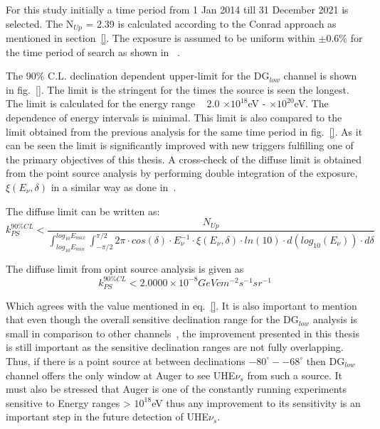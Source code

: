 For this study initially a time period from 1 Jan 2014 till 31 December 2021 is selected. The N$_{Up}$ = 2.39 is calculated according to the Conrad approach as mentioned in section~\ref{}. The exposure is assumed to be uniform within $\pm 0.6\%$ for the time period of search as shown in ~\cite{}. 

The 90\% C.L. declination dependent upper-limit for the DG$_{low}$ channel is shown in fig.~\ref{}. The limit is the stringent for the times the source is seen the longest. The limit is calculated for the energy range ~ 2.0 $\times 10^{18}$eV - $\times 10^{20}$eV. The dependence of energy intervals is minimal. This limit is also compared to the limit obtained from the previous analysis for the same time period in fig.~\ref{}. As it can be seen the limit is significantly improved with new triggers fulfilling one of the primary objectives of this thesis.     
A cross-check of the diffuse limit is obtained from the point source analysis by performing double integration of the exposure, $\xi(E_{\nu}, \delta)$ in a similar way as done in~\cite{}.

The diffuse limit can be written as:
\begin{equation}
  k_{PS}^{90\%CL} < \frac{N_{Up}}{\int_{log_{10}E_{min}}^{log_{10}E_{max}} \int_{-\pi/2}^{\pi/2}2\pi \cdot cos(\delta) \cdot E_{\nu}^{-1} \cdot \xi(E_{\nu}, \delta) \cdot ln(10) \cdot d(log_{10}(E_{\nu})) \cdot d\delta} 
\end{equation}

The diffuse limit from opint source analysis is given as 
\begin{equation}
  k_{PS}^{90\%CL} < 2.0000 \times 10^{-8} GeV cm^{-2} s^{-1} sr^{-1}
\end{equation}

Which agrees with the value mentioned in eq.~\ref{}. It is also important to mention that even though the overall sensitive declination range for the DG$_{low}$ analysis is small in comparison to other channels~\cite{}, the improvement presented in this thesis is still important as the sensitive declination ranges are not fully overlapping. Thus, if there is a point source at between declinations $-80^{\circ}- -68^{\circ}$ then DG$_{low}$ channel offers the only window at Auger to see UHE$\nu_s$ from such a source. It must also be stressed that Auger is one of the constantly running experiments sensitive to Energy ranges > $10^{18}$eV thus any improvement to its sensitivity is an important step in the future detection of UHE$\nu_s$. 




